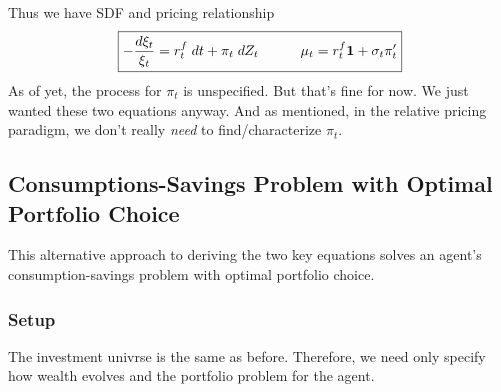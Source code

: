 \documentclass[12pt]{article}
\theoremstyle{plain}
\theoremstyle{definition}
\theoremstyle{remark}
\begin{document}
Thus we have SDF and pricing relationship
\begin{align*}
  \boxed{%
  -
  \frac{d\xi_t}{\xi_t}
  =
  r_t^f\;dt + \pi_t\;dZ_t
  \quad
  \qquad
  \mu_t
  =
  r_t^f\mathbf{1}
  +\sigma_t\pi_t'
  }
\end{align*}
As of yet, the process for $\pi_t$ is unspecified. But that's fine for
now. We just wanted these two equations anyway.
And as mentioned, in the relative pricing paradigm, we don't really
\emph{need} to find/characterize $\pi_t$.



\clearpage
\subsection{Consumptions-Savings Problem with Optimal Portfolio Choice}

This alternative approach to deriving the two key equations solves an
agent's consumption-savings problem with optimal portfolio choice.


\subsubsection{Setup}

The investment univrse is the same as before.
Therefore, we need only specify how wealth evolves and the portfolio
problem for the agent.
\end{document}
